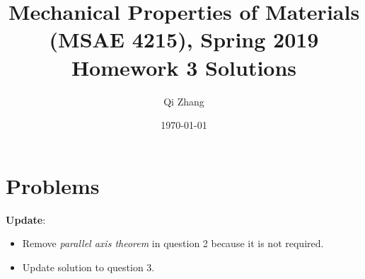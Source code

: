\documentclass[12pt]{article}
\begin{document}

\title{Mechanical Properties of Materials (MSAE 4215), Spring 2019\\ Homework 3 Solutions}
\author{Qi Zhang}
\date{\today}

\maketitle

\tableofcontents
\listoffigures
\listoftables

\section{Problems}
{\color{red} \textbf{Update}:
\begin{itemize}
	\item Remove \textit{parallel axis theorem} in question 2 because it is not required.
	\item Update solution to question 3.
\end{itemize}}
\end{document}
